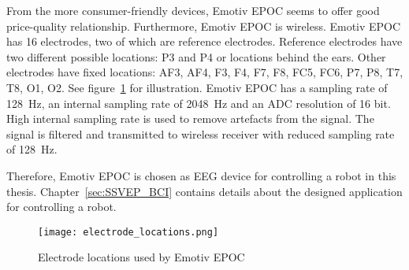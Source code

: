 From the more consumer-friendly devices, Emotiv EPOC seems to offer good price-quality relationship. Furthermore, Emotiv EPOC is wireless. Emotiv EPOC has 16 electrodes, two of which are reference electrodes. Reference electrodes have two different possible locations: P3 and P4 or locations behind the ears. Other electrodes have fixed locations: AF3, AF4, F3, F4, F7, F8, FC5, FC6, P7, P8, T7, T8, O1, O2. See figure~\ref{fig:electrode_locations} for illustration. Emotiv EPOC has a sampling rate of \SI{128}{Hz}, an internal sampling rate of \SI{2048}{Hz} and an \gls{ADC} resolution of 16 bit. High internal \gls{sampling rate} is used to remove artefacts from the signal. The signal is filtered and transmitted to wireless receiver with reduced \gls{sampling rate} of \SI{128}{Hz}.

Therefore, Emotiv EPOC is chosen as \gls{EEG} device for controlling a robot in this thesis. Chapter~\ref{sec:SSVEP_BCI} contains details about the designed application for controlling a robot.
\newpage
\begin{figure}[h]
	\centering
	\texttt{[image: electrode\_locations.png]}
	\caption{Electrode locations used by Emotiv EPOC\protect\footnotemark}
	\label{fig:electrode_locations}
\end{figure}


